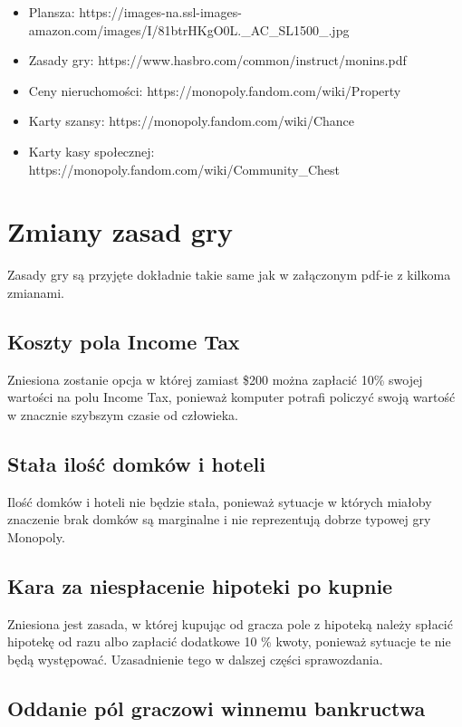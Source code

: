 \documentclass{article}
\begin{document}
\begin{itemize}
	\item Plansza: https://images-na.ssl-images-amazon.com/images/I/81btrHKgO0L.\_AC\_SL1500\_.jpg
	\item Zasady gry: https://www.hasbro.com/common/instruct/monins.pdf
	\item Ceny nieruchomości: https://monopoly.fandom.com/wiki/Property
	\item Karty szansy: https://monopoly.fandom.com/wiki/Chance
	\item Karty kasy społecznej: https://monopoly.fandom.com/wiki/Community\_Chest
\end{itemize}

\section{Zmiany zasad gry}

Zasady gry są przyjęte dokładnie takie same jak w załączonym pdf-ie z kilkoma zmianami.

\subsection{Koszty pola Income Tax}

Zniesiona zostanie opcja w której zamiast \$200 można zapłacić 10\% swojej wartości na polu Income Tax, ponieważ komputer potrafi policzyć swoją wartość w znacznie szybszym czasie od człowieka.

\subsection{Stała ilość domków i hoteli}

Ilość domków i hoteli nie będzie stała, ponieważ sytuacje w których miałoby znaczenie brak domków są marginalne i nie reprezentują dobrze typowej gry Monopoly. 

\subsection{Kara za niespłacenie hipoteki po kupnie}

Zniesiona jest zasada, w której kupując od gracza pole z hipoteką należy spłacić hipotekę od razu albo zapłacić dodatkowe 10 \% kwoty, ponieważ sytuacje te nie będą występować. Uzasadnienie tego w dalszej części sprawozdania.

\subsection{Oddanie pól graczowi winnemu bankructwa}
\end{document}
